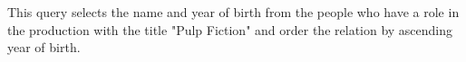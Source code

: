 This query selects the name and year of birth from the people who have a role in the production with the title "Pulp Fiction" and order the relation by ascending year of birth.